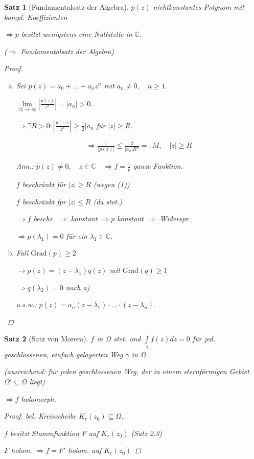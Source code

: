 \documentclass[ngerman,halfparskip]{scrartcl}
\newtheorem*{satz*}{Satz}
\theoremstyle{definition}
\def\C{\mathbb C}
\begin{document}
\begin{satz*}[Fundamentalsatz der Algebra] $p(z)$ nichtkonstantes Polynom mit kompl. Koeffizienten

$\Rightarrow p$ besitzt wenigstens eine Nullstelle in $\C$. 

($\Rightarrow$ Fundamentalsatz der Algebra)

\begin{proof}

\begin{enumerate}[a)]
	\item Sei $p(z)=a_0+\ldots+a_nz^n$ mit $a_n\neq 0, \quad n\geq 1.$
	
	$\lim\limits_{|z|\rightarrow \infty} \left | \frac{p(z)}{z^n} \right| =|a_n|>0.$
	
	$\Rightarrow \exists R>0: \left | \frac{p(z)}{z^n} \right| \geq \frac 12 |a_n $ für $|z|\geq R$. 
	
	\begin{gather*}\tag{1}\Rightarrow \frac{1}{|p(z)|}\leq \frac{2}{|a_n|R^n}=:M, \quad |z|\geq R\end{gather*}
	
	Ann.: $p(z)\neq 0, \quad z\in\C\quad \Rightarrow f=\frac 1p$ ganze Funktion.
	
	$f$ beschränkt für $|z|\geq R$ (wegen (1))
	
	$f$ beschränkt fpr $|z|\leq R$ (da stet.)
	
	$\Rightarrow f$ beschr. $\Rightarrow $ konstant $\Rightarrow p$ konstant $\Rightarrow$ Widerspr.
	
	$\Rightarrow p(\lambda_1)=0$ für ein $\lambda_1\in\C$.
	
	\item Fall $\text{Grad} (p)\geq 2$
	
	$\rightarrow p(z)=(z-\lambda_1)q(z) $ mit $\text{Grad}(q)\geq 1$
	
	$\Rightarrow q(\lambda_2)=0$ nach a)
	
	u.s.w.: $p(z)=a_n(z-\lambda_1)\cdot\ldots\cdot (z-\lambda_n).$
\end{enumerate}

\end{proof}
\end{satz*}

\begin{satz*}[Satz von Morera]

$f$ in $\Omega$ stet. und $\int\limits_\gamma f(z)dz=0 $ für jed. geschlossenen, einfach gelagerten Weg $\gamma$ in $\Omega$ 

(ausreichend: für jeden geschlossenen Weg, der in einem sternförmigen Gebiet $\Omega'\subseteq\Omega$ liegt)

$\Rightarrow f$ holomorph.

\begin{proof}
bel. Kreisscheibe $K_r(z_0)\subseteq\Omega$.

$f$ besitzt Stammfunktion $F$ auf $K_r(z_0)$ (Satz 2.3)

$F$ holom. $\Rightarrow f=F'$ holom. auf $K_r(z_0)$ 
\end{proof}

\end{satz*}
\end{document}
